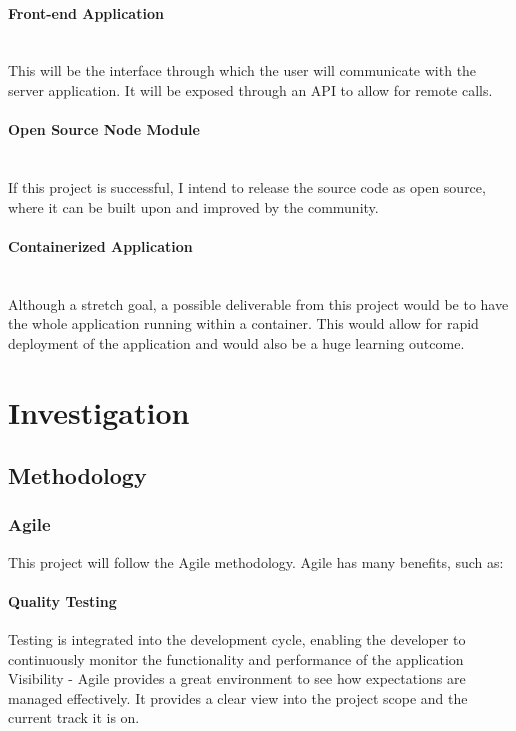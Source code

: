 \documentclass{article}
\begin{document}
\paragraph{Front-end Application}\mbox{}\\
This will be the interface through which the user will communicate with the server application. It will be exposed through an API to allow for remote calls.

\paragraph{Open Source Node Module}\mbox{}\\
If this project is successful, I intend to release the source code as open source, where it can be built upon and improved by the community.

\paragraph{Containerized Application}\mbox{}\\
Although a stretch goal, a possible deliverable from this project would be to have the whole application running within a container. This would allow for rapid deployment of the application and would also be a huge learning outcome.


\section{Investigation}

\subsection{Methodology}

\subsubsection{Agile}
\label{subs:agile}
This project will follow the Agile methodology. Agile has many benefits, such as:

\paragraph{Quality Testing} Testing is integrated into the development cycle, enabling the developer to continuously monitor the functionality and performance of the application
Visibility - Agile provides a great environment to see how expectations are managed effectively. It provides a clear view into the project scope and the current track it is on.
\end{document}
